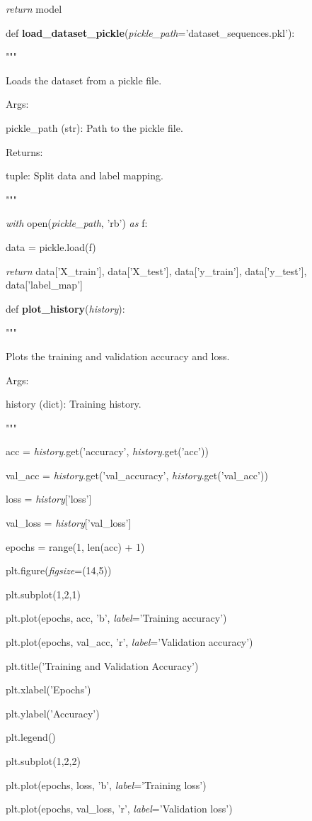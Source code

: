 \documentclass[
]{article}
\begin{document}
\emph{return} model

def \textbf{load\_dataset\_pickle}(\emph{pickle\_path}='dataset\_sequences.pkl'):

"""

Loads the dataset from a pickle file.

Args:

pickle\_path (str): Path to the pickle file.

Returns:

tuple: Split data and label mapping.

"""

\emph{with} open(\emph{pickle\_path}, 'rb') \emph{as} f:

data = pickle.load(f)

\emph{return} data{[}'X\_train'{]}, data{[}'X\_test'{]}, data{[}'y\_train'{]}, data{[}'y\_test'{]}, data{[}'label\_map'{]}

def \textbf{plot\_history}(\emph{history}):

"""

Plots the training and validation accuracy and loss.

Args:

history (dict): Training history.

"""

acc = \emph{history}.get('accuracy', \emph{history}.get('acc'))

val\_acc = \emph{history}.get('val\_accuracy', \emph{history}.get('val\_acc'))

loss = \emph{history}{[}'loss'{]}

val\_loss = \emph{history}{[}'val\_loss'{]}

epochs = range(1, len(acc) + 1)

plt.figure(\emph{figsize}=(14,5))

plt.subplot(1,2,1)

plt.plot(epochs, acc, 'b', \emph{label}='Training accuracy')

plt.plot(epochs, val\_acc, 'r', \emph{label}='Validation accuracy')

plt.title('Training and Validation Accuracy')

plt.xlabel('Epochs')

plt.ylabel('Accuracy')

plt.legend()

plt.subplot(1,2,2)

plt.plot(epochs, loss, 'b', \emph{label}='Training loss')

plt.plot(epochs, val\_loss, 'r', \emph{label}='Validation loss')
\end{document}
